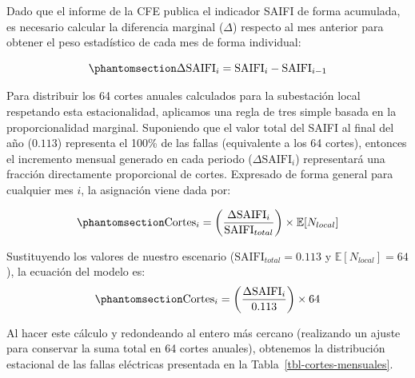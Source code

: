 \documentclass[
  spanish,
  us-letterpaper,
]{scrreprt}
\numberwithin{equation}{section}
\theoremstyle{plain}
\theoremstyle{plain}
\theoremstyle{definition}
\theoremstyle{plain}
\theoremstyle{remark}
\begin{document}
Dado que el informe de la CFE publica el indicador SAIFI de forma
acumulada, es necesario calcular la diferencia marginal (\(\Delta\))
respecto al mes anterior para obtener el peso estadístico de cada mes de
forma individual:

\begin{equation}\phantomsection\label{eq-delta-saifi}{
\Delta \text{SAIFI}_i = \text{SAIFI}_i - \text{SAIFI}_{i-1}
}\end{equation}

Para distribuir los 64 cortes anuales calculados para la subestación
local respetando esta estacionalidad, aplicamos una regla de tres simple
basada en la proporcionalidad marginal. Suponiendo que el valor total
del SAIFI al final del año (\(0.113\)) representa el 100\% de las fallas
(equivalente a los 64 cortes), entonces el incremento mensual generado
en cada periodo (\(\Delta \text{SAIFI}_i\)) representará una fracción
directamente proporcional de cortes. Expresado de forma general para
cualquier mes \(i\), la asignación viene dada por:

\begin{equation}\phantomsection\label{eq-reparto-cortes}{
\text{Cortes}_i = \left( \frac{\Delta \text{SAIFI}_i}{\text{SAIFI}_{total}} \right) \times \mathbb{E}[N_{local}]
}\end{equation}

Sustituyendo los valores de nuestro escenario
(\(\text{SAIFI}_{total} = 0.113\) y \(\mathbb{E}[N_{local}] = 64\)), la
ecuación del modelo es:
\begin{equation}\phantomsection\label{eq-modelo-cortes}{
\text{Cortes}_i = \left( \frac{\Delta \text{SAIFI}_i}{0.113} \right) \times 64
}\end{equation}

Al hacer este cálculo y redondeando al entero más cercano (realizando un
ajuste para conservar la suma total en 64 cortes anuales), obtenemos la
distribución estacional de las fallas eléctricas presentada en la
Tabla~\ref{tbl-cortes-mensuales}.
\end{document}
